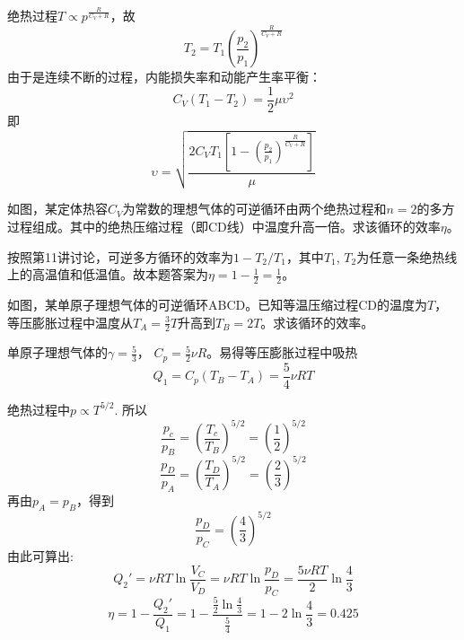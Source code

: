 \documentclass[CJK]{beamer}
\begin{document}
\begin{frame}
  \bch
  绝热过程$T\propto p^{\frac{R}{C_V+R}}$，故
  $$T_2 = T_1\left(\frac{p_2}{p_1}\right)^{\frac{R}{C_V+R}}$$
  由于是连续不断的过程，内能损失率和动能产生率平衡：
  $$  C_V(T_1-T_2) =  \frac{1}{2}\mu\upsilon^2$$
  即
  $$\upsilon = \sqrt{\frac{2C_VT_1\left[1-\left(\frac{p_2}{p_1}\right)^{\frac{R}{C_V+R}}\right]}{\mu}}$$
  
  \ech
\end{frame}

\begin{frame}
  \chtitle{\proid (\stwo)}
  \bch

  如图，某定体热容$C_V$为常数的理想气体的可逆循环由两个绝热过程和$n=2$的多方过程组成。其中的绝热压缩过程（即CD线）中温度升高一倍。求该循环的效率$\eta$。
  \ech
\end{frame}

\begin{frame}
  \bch
  按照第11讲讨论，可逆多方循环的效率为$1-T_2/T_1$，其中$T_1$, $T_2$为任意一条绝热线上的高温值和低温值。故本题答案为$\eta = 1 - \frac{1}{2} = \frac{1}{2}$。
  \ech
\end{frame}

\begin{frame}
  \chtitle{\proid (\sthree)}
  \bch

  如图，某单原子理想气体的可逆循环ABCD。已知等温压缩过程CD的温度为$T$，等压膨胀过程中温度从$T_A=\frac{3}{2}T$升高到$T_B=2T$。求该循环的效率。
  
  \ech
\end{frame}

\begin{frame}
  \bch
  {\scriptsize
  单原子理想气体的$\gamma = \frac{5}{3}$， $C_p = \frac{5}{2}\nu R$。易得等压膨胀过程中吸热
  $$Q_1 = C_p(T_B-T_A) = \frac{5}{4}\nu R T$$

  绝热过程中$p \propto T^{5/2}$.
  所以
  $$\frac{p_c}{p_B} = \left(\frac{T_c}{T_B}\right)^{5/2} = \left(\frac{1}{2}\right)^{5/2}$$
  $$\frac{p_D}{p_A} =\left(\frac{T_D}{T_A}\right)^{5/2} = \left(\frac{2}{3}\right)^{5/2}$$
  再由$p_A=p_B$，得到
  $$\frac{p_D}{p_C} =   \left(\frac{4}{3}\right)^{5/2}$$
  由此可算出:
  $$ Q_2' = \nu R T \ln \frac{V_C}{V_D} = \nu R T \ln \frac{p_D}{p_C} = \frac{5\nu RT}{2} \ln\frac{4}{3} $$
  $$\eta = 1 - \frac{Q_2'}{Q_1} = 1 - \frac{\frac{5}{2}\ln\frac{4}{3}}{\frac{5}{4}} = 1-2\ln\frac{4}{3} = 0.425 $$
  }
  \ech
\end{frame}
\end{document}
